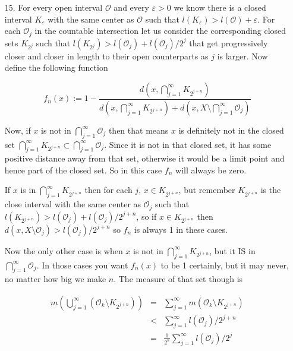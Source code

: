 \documentclass[oneside]{book}
\begin{document}
\begin{enumerate}
\item[15.] For every open interval $\mathcal{O}$ and every $\varepsilon > 0$ we know there is a closed interval $K_{\varepsilon}$ with the same center as $\mathcal{O}$ such that $l(K_\varepsilon) > l(\mathcal{O}) + \varepsilon$. For each $\mathcal{O}_j$ in the countable intersection let us consider the corresponding closed sets $K_{2^j}$ such that $l(K_{2^j}) > l(\mathcal{O}_j) + l(\mathcal{O}_j)/2^j$ that get progressively closer and closer in length to their open counterparts as $j$ is larger. Now define the following function

\begin{equation}
f_n(x) :=  1- \frac{d(x, \bigcap_{j=1}^\infty K_{2^{j+n}})}{d(x, \bigcap_{j=1}^\infty K_{2^{j+n}})+d(x,X \setminus \bigcap_{j=1}^\infty \mathcal{O}_j)}
\end{equation}

Now, if $x$ is not in $\bigcap_{j=1}^\infty \mathcal{O}_j$ then that means $x$ is definitely not in the closed set $\bigcap_{j=1}^\infty K_{2^{j+n}} \subset \bigcap_{j=1}^\infty \mathcal{O}_j$. Since it is not in that closed set, it has some positive distance away from that set, otherwise it would be a limit point and hence part of the closed set. So in this case  $f_n$ will always be zero.

If $x$ is in $\bigcap_{j=1}^\infty K_{2^{j+n}}$ then for each $j$, $x \in K_{2^{j+n}}$, but remember $K_{2^{j+n}}$ is the close interval with the same center as $\mathcal{O}_j$ such that $l(K_{2^{j+n}}) > l(\mathcal{O}_j) + l(\mathcal{O}_j)/2^{j+n}$, so if $x \in  K_{2^{j+n}}$ then $d(x,X \setminus  \mathcal{O}_j) > l(\mathcal{O}_j)/2^{j+n}$ so $f_n$ is always 1 in these cases.

Now the only other case is when $x$ is not in $\bigcap_{j=1}^\infty K_{2^{j+n}}$, but it IS in $\bigcap_{j=1}^\infty \mathcal{O}_j$. In those cases you want $f_n(x)$ to be 1 certainly, but it may never, no matter how big we make $n$. The measure of that set though is

\begin{eqnarray}
m\left( \bigcup_{j=1}^\infty (\mathcal{O}_k \setminus K_{2^{j+n}}) \right) &=& \sum_{j=1}^\infty m(\mathcal{O}_k \setminus K_{2^{j+n}}) \nonumber \\
&<& \sum_{j=1}^\infty l(\mathcal{O}_j)/2^{j+n} \nonumber \\
&=& \frac{1}{2^n}\sum_{j=1}^\infty l(\mathcal{O}_j)/2^{j}
\end{eqnarray}




\end{enumerate}
\end{document}
